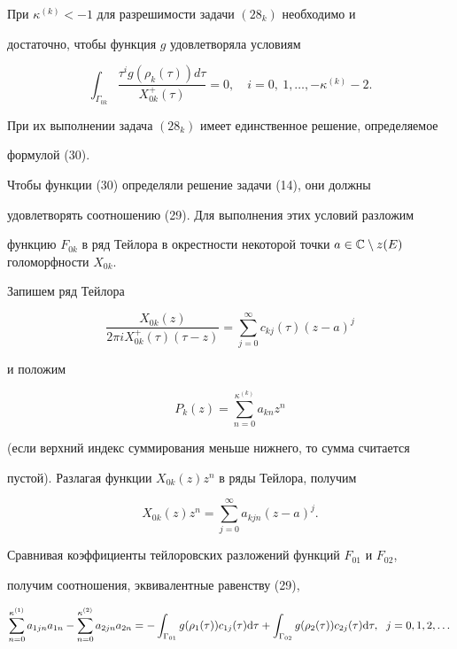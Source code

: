 При $\kappa^{(k)}<-1$ для разрешимости задачи $(28_k)$ необходимо и


достаточно, чтобы функция $g$ удовлетворяла условиям


\begin{equation}


\int_{\Gamma_{0k}}\frac{\tau^ig(\rho_k(\tau))d\tau}{X_{0k}^+(\tau)}=0,


\quad i=0,\ 1,\dotsc,-\kappa^{(k)}-2.


\end{equation}


При их выполнении задача $(28_k)$ имеет единственное решение, определяемое


формулой (30).





Чтобы функции (30) определяли решение задачи (14), они должны


удовлетворять соотношению (29). Для выполнения этих условий разложим


функцию $F_{0k}$ в ряд Тейлора в окрестности некоторой точки $a\in


\Bbb C\setminus z(E)$ голоморфности $X_{0k}$.





Запишем ряд Тейлора


$$


\frac{X_{0k}(z)}{2\pi iX^+_{0k}(\tau)(\tau -z)}=


\sum_{j=0}^\infty c_{kj}(\tau)(z-a)^j


$$


и положим


$$


P_k(z)=\sum_{n=0}^{\kappa^{(k)}}a_{kn}z^n


$$


(если верхний индекс суммирования меньше нижнего, то сумма считается


пустой). Разлагая функции $X_{0k}(z)z^n$ в ряды Тейлора, получим


$$


X_{0k}(z)z^n=\sum_{j=0}^{\infty}a_{kjn}(z-a)^j.


$$


Сравнивая коэффициенты тейлоровских разложений функций $F_{01}$ и $F_{02}$,


получим соотношения, эквивалентные равенству (29),


\begin{equation}


\sum_{n=0}^{\kappa^{(1)}}a_{1jn}a_{1n}-


\sum_{n=0}^{\kappa^{(2)}}a_{2jn}a_{2n}=


-\int_{\Gamma_{01}}g(\rho_1(\tau ))c_{1j}(\tau )\d\tau +


\int_{\Gamma_{02}}g(\rho_2(\tau ))c_{2j}(\tau )\d\tau,\ \;j=0,1,2,\dotsc


\end{equation}


